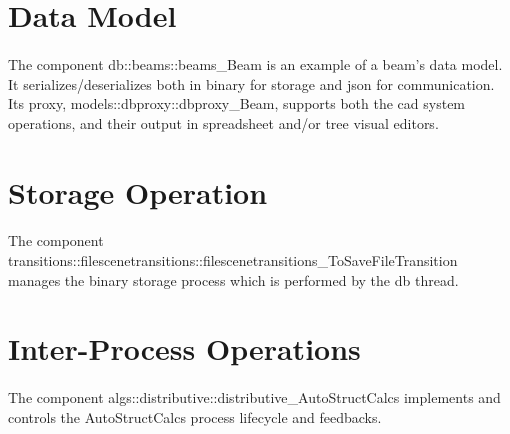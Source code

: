 \section{Data Model}
\paragraph{}
The component db::beams::beams\_Beam is an example of a beam's data model. It serializes/deserializes both in binary for storage and json for communication. Its proxy, models::dbproxy::dbproxy\_Beam, supports both the cad system operations, and their output in spreadsheet and/or tree visual editors.
\section{Storage Operation}
\paragraph{}
The component transitions::filescenetransitions::filescenetransitions\_ToSaveFileTransition manages the binary storage process which is performed by the db thread.
\section{Inter-Process Operations}
\paragraph{}
The component algs::distributive::distributive\_AutoStructCalcs implements and controls the AutoStructCalcs process lifecycle and feedbacks.
